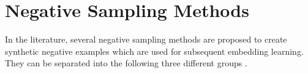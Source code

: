 \section{Negative Sampling Methods} 
\label{sec:negativesamplingmethods}

In the literature, several negative sampling methods are proposed to create synthetic negative examples which are used for subsequent embedding learning.
They can be separated into the following three different groups \cite{qianunderstanding}.





